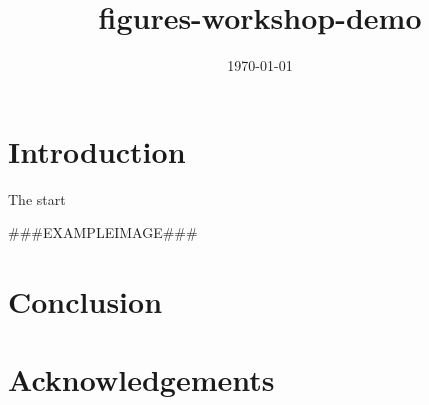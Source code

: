 \documentclass[times]{article}
\begin{document}
\title{figures-workshop-demo}

\onecolumn

\author{}
\date{\today}

\maketitle


\tableofcontents

\newpage

\section{Introduction}

The start

###EXAMPLEIMAGE###

\section{Conclusion}

\section{Acknowledgements}



\end{document}

